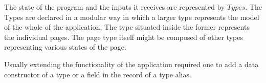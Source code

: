 The state of
the program and the inputs it receives are represented by $Types$. The Types
are declared in a modular way in which a larger type represents the model of
the whole of the application. The type situated inside the former represents
the individual pages. The page type itself might be composed of other types
representing various states of the page.

Usually extending the
functionality of the application required one to add a data constructor of a
type or a field in the record of a type alias.
